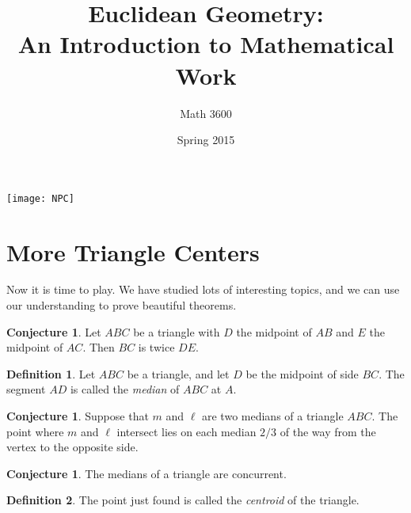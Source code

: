 \documentclass{tufte-handout}
\title{Euclidean Geometry:\\An Introduction to Mathematical Work}
\author[]{Math 3600}
\date{Spring 2015}
\theoremstyle{definition}
\newtheorem{conjecture}[problem]{Conjecture}
\newtheorem*{definition}{Definition}
\newtheorem{challenge}[problem]{Challenge}
\begin{document}
\maketitle

\begin{marginfigure}
    \texttt{[image: NPC]}
\end{marginfigure}

\setcounter{section}{17}
\section{More Triangle Centers}

Now it is time to play. We have studied lots of interesting topics, and we can use our understanding to prove beautiful theorems.

\begin{conjecture} Let $ABC$ be a triangle with $D$ the midpoint of $AB$ and $E$ the midpoint of $AC$. Then $BC$ is twice $DE$.
\end{conjecture}

\begin{definition}\label{defn:median}
Let $ABC$ be a triangle, and let $D$ be the midpoint of side $BC$. The segment $AD$ is called the \emph{median} of $ABC$ at $A$.
\end{definition}

\begin{conjecture}\label{conj:location-median}
Suppose that $m$ and $\ell $ are two medians of a triangle $ABC$.  The point where $m$ and $\ell$ intersect lies on each median $2/3$ of the way from the vertex to the opposite side.
\end{conjecture}

\begin{conjecture}\label{conj:medians-concurrent}
The medians of a triangle are concurrent.
\end{conjecture}

\begin{definition}\label{defn:centroid}
The point just found is called the \emph{centroid} of the triangle.
\end{definition}

%
\end{document}

